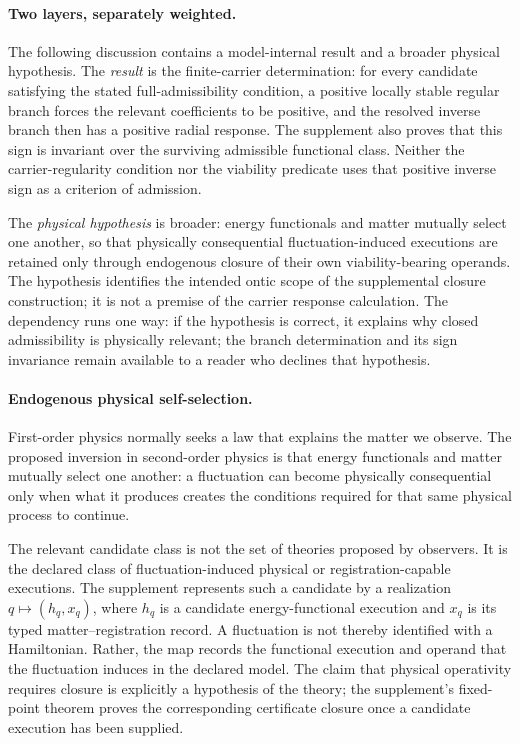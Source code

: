 \documentclass[10pt,twoside,a5paper]{article}
\theoremstyle{definition}
\begin{document}
\paragraph{Two layers, separately weighted.}
The following discussion contains a model-internal result and a broader physical
hypothesis.  The \emph{result} is the finite-carrier determination: for every
candidate satisfying the stated full-admissibility condition, a positive locally
stable regular branch forces the relevant coefficients to be positive, and the
resolved inverse branch then has a positive radial response.  The supplement
also proves that this sign is invariant over the surviving admissible functional
class.  Neither the carrier-regularity condition nor the viability predicate
uses that positive inverse sign as a criterion of admission.

The \emph{physical hypothesis} is broader: energy functionals and matter
mutually select one another, so that physically consequential
fluctuation-induced executions are retained only through endogenous closure of
their own viability-bearing operands.  The hypothesis identifies the intended
ontic scope of the supplemental closure construction; it is not a premise of
the carrier response calculation.  The dependency runs one way: if the
hypothesis is correct, it explains why closed admissibility is physically
relevant; the branch determination and its sign invariance remain available to a
reader who declines that hypothesis.

\paragraph{Endogenous physical self-selection.}
First-order physics normally seeks a law that explains the matter we observe.
The proposed inversion in second-order physics is that energy functionals and
matter mutually select one another: a fluctuation can become physically
consequential only when what it produces creates the conditions required for
that same physical process to continue.

The relevant candidate class is not the set of theories proposed by observers.
It is the declared class of fluctuation-induced physical or registration-capable
executions.  The supplement represents such a candidate by a realization
$q\mapsto(h_q,x_q)$, where $h_q$ is a candidate energy-functional execution and
$x_q$ is its typed matter--registration record.  A fluctuation is not thereby
identified with a Hamiltonian.  Rather, the map records the functional execution
and operand that the fluctuation induces in the declared model.  The claim that
physical operativity requires closure is explicitly a hypothesis of the theory;
the supplement's fixed-point theorem proves the corresponding certificate
closure once a candidate execution has been supplied.
\end{document}
